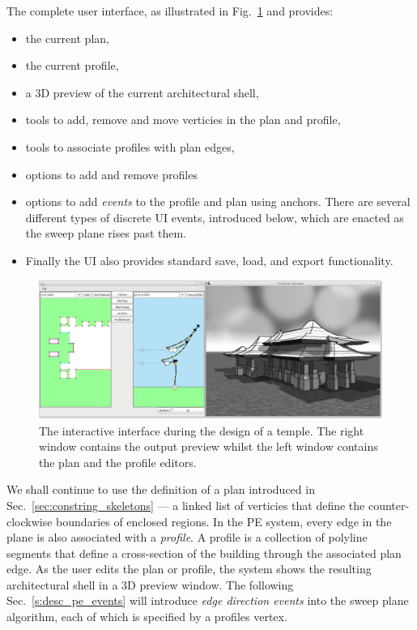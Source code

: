 The complete user interface, as illustrated in Fig.~\ref{fig:ui} and provides:
\begin{itemize}
\item{the current plan,}
\item{the current profile,}
\item{a 3D preview of the current architectural shell,}
\item{tools to add, remove and move verticies in the plan and profile,}
\item{tools to associate profiles with plan edges,}
\item{options to add and remove profiles}
\item{options to add \emph{events} to the profile and plan using anchors. There are several different types of discrete UI events, introduced below, which are enacted as the sweep plane rises past them.}
\item{Finally the UI also provides standard save, load, and export functionality.}
\end{itemize}

\begin{figure}
  \centering
  \includegraphics[width=1.0\columnwidth]{ui.png}
  \caption[The PE GUI.]{\label{fig:ui}
The interactive interface during the design of a temple. The right window contains the output preview whilst the left window contains the plan and the profile editors.
}
\end{figure}

We shall continue to use the definition of a plan introduced in Sec.~\ref{sec:constring_skeletons} --- a linked list of verticies that define the counter-clockwise boundaries of enclosed regions. In the PE system, every edge in the plane is also associated with a \emph{profile}. A profile is a collection of polyline segments that define a cross-section of the building through the associated plan edge. As the user edits the plan or profile, the system shows the resulting architectural shell in a 3D preview window. The following Sec.~\ref{s:desc_pe_events} will introduce  \emph{edge direction events} into the sweep plane algorithm, each of which is specified by a profiles vertex.

